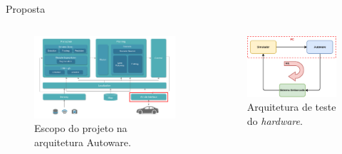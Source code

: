 \documentclass{if-beamer}
\begin{document}
\begin{frame}{Proposta}
	
	\begin{columns}
		
		\begin{column}{0.6\textwidth}
			
			\begin{figure}[H]
				\centering
				\includegraphics[width=\linewidth]{img/architecture.png}
				\caption{Escopo do projeto na arquitetura Autoware.}
				\label{fig:architecture}
			\end{figure}
			
		\end{column}
		
		\hspace{-0.5cm}
		
\pause
		
		\begin{column}{0.45\textwidth}
			
			\begin{figure}[H]
				\centering
				\includegraphics[width=\linewidth]{img/architecture_HIL}
				\caption{Arquitetura de teste do \textit{hardware}.}
				\label{fig:architecture_HIL}
			\end{figure}
			
		\end{column}
		
	\end{columns}
	
\end{frame}
\end{document}
